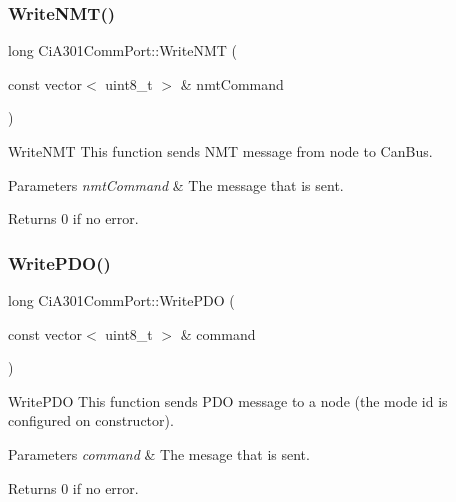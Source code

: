 \subsubsection{\texorpdfstring{Write\+N\+M\+T()}{WriteNMT()}}
{\footnotesize\ttfamily long Ci\+A301\+Comm\+Port\+::\+Write\+N\+MT (\begin{DoxyParamCaption}\item[{const vector$<$ uint8\+\_\+t $>$ \&}]{nmt\+Command }\end{DoxyParamCaption})}



Write\+N\+MT This function sends N\+MT message from node to Can\+Bus. 


\begin{DoxyParams}{Parameters}
{\em nmt\+Command} & The message that is sent. \\
\hline
\end{DoxyParams}
\begin{DoxyReturn}{Returns}
0 if no error. 
\end{DoxyReturn}
\mbox{\label{classCiA301CommPort_a56d2c604b11363e6b287f59b68a546bd}} 
\subsubsection{\texorpdfstring{Write\+P\+D\+O()}{WritePDO()}}
{\footnotesize\ttfamily long Ci\+A301\+Comm\+Port\+::\+Write\+P\+DO (\begin{DoxyParamCaption}\item[{const vector$<$ uint8\+\_\+t $>$ \&}]{command }\end{DoxyParamCaption})}



Write\+P\+DO This function sends P\+DO message to a node (the mode id is configured on constructor). 


\begin{DoxyParams}{Parameters}
{\em command} & The mesage that is sent. \\
\hline
\end{DoxyParams}
\begin{DoxyReturn}{Returns}
0 if no error. 
\end{DoxyReturn}
\mbox{\label{classCiA301CommPort_a4d97c27423b2323f8475f6e5c2f91575}} 

